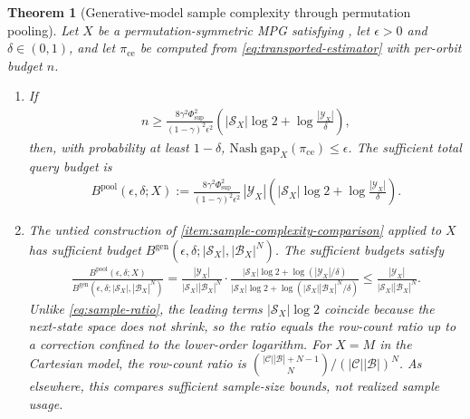 \documentclass{article}
\theoremstyle{plain}
\newtheorem{theorem}{Theorem}
\theoremstyle{definition}
\theoremstyle{remark}
\newcommand{\Nash}{\mathrm{Nash\ gap}}
\newcommand{\abs}[1]{\left\lvert#1\right\rvert}
\newcommand{\Phisup}{\Phi_{\mathrm{sup}}}
\begin{document}
\begin{theorem}[Generative-model sample complexity through permutation pooling]
\label{thm:perm-sample-complexity}
Let $X$ be a permutation-symmetric MPG satisfying ,
let $\epsilon>0$ and $\delta\in(0,1)$, and let $\pi_{\mathrm{ce}}$ be computed
from \eqref{eq:transported-estimator} with per-orbit budget $n$.
\begin{enumerate}[label=\arabic*.,leftmargin=2.0em,itemsep=2pt,topsep=2pt]
  \item \label{item:perm-sample-bound}
  If
  \begin{align}
    n
    \ge
    \frac{8\gamma^2\Phisup^2}{(1-\gamma)^2\epsilon^2}
    \left(
      \abs{\mathcal S_X}\log 2
      +
      \log\frac{\abs{\mathcal Y_X}}{\delta}
    \right),
    \label{eq:perm-per-orbit-budget}
  \end{align}
  then, with probability at least $1-\delta$,
  $\Nash_X(\pi_{\mathrm{ce}})\le\epsilon$. The sufficient total query budget
  is
  \begin{align}
    B^{\mathrm{pool}}(\epsilon,\delta;X)
    :=
    \frac{8\gamma^2\Phisup^2}{(1-\gamma)^2\epsilon^2}\,
    \abs{\mathcal Y_X}
    \left(
      \abs{\mathcal S_X}\log 2
      +
      \log\frac{\abs{\mathcal Y_X}}{\delta}
    \right).
    \label{eq:perm-total-budget}
  \end{align}

  \item \label{item:perm-sample-comparison}
  The untied construction of
  \ref{item:sample-complexity-comparison} applied
  to $X$ has sufficient budget
  $B^{\mathrm{gen}}(\epsilon,\delta;\abs{\mathcal S_X},
  \abs{\mathcal B_X}^N)$. The sufficient budgets satisfy
  \begin{align}
    \frac{B^{\mathrm{pool}}(\epsilon,\delta;X)}
         {B^{\mathrm{gen}}(\epsilon,\delta;\abs{\mathcal S_X},
          \abs{\mathcal B_X}^N)}
    =
    \frac{\abs{\mathcal Y_X}}
         {\abs{\mathcal S_X}\abs{\mathcal B_X}^N}
    \cdot
    \frac{\abs{\mathcal S_X}\log2
          +\log(\abs{\mathcal Y_X}/\delta)}
         {\abs{\mathcal S_X}\log2
          +\log(\abs{\mathcal S_X}\abs{\mathcal B_X}^N/\delta)}
    \le
    \frac{\abs{\mathcal Y_X}}
         {\abs{\mathcal S_X}\abs{\mathcal B_X}^N}.
    \label{eq:perm-sample-ratio}
  \end{align}
  Unlike \eqref{eq:sample-ratio}, the leading terms
  $\abs{\mathcal S_X}\log2$ coincide because the next-state space does not
  shrink, so the ratio equals the row-count ratio up to a correction confined
  to the lower-order logarithm. For $X=M$ in the Cartesian model, the
  row-count ratio is
  $\binom{\abs{\mathcal C}\abs{\mathcal B}+N-1}{N}
  \big/(\abs{\mathcal C}\abs{\mathcal B})^N$. As elsewhere, this compares
  sufficient sample-size bounds, not realized sample usage.
\end{enumerate}
\end{theorem}
\end{document}
